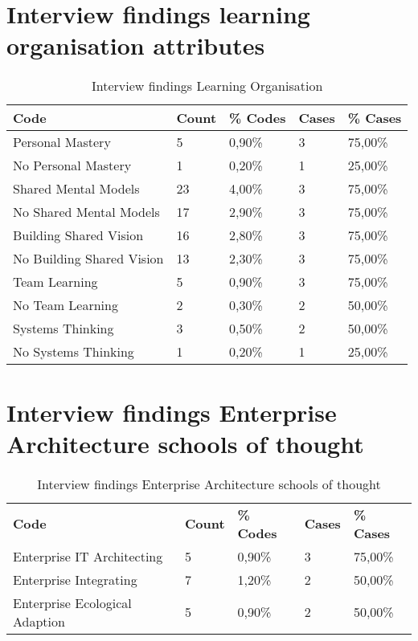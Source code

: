 \section{Interview findings learning organisation attributes}
\label{sec:interviewresultslearningorganisation}
\begin{table}[H]
	\centering
	\begin{tabular}{lllll}
		\toprule
		\textbf{Code} & \textbf{Count} & \textbf{\% Codes} & \textbf{Cases} & \textbf{\% Cases} \\
		\midrule
		Personal Mastery & 5     & 0,90\% & 3     & 75,00\% \\
		No Personal Mastery & 1     & 0,20\% & 1     & 25,00\% \\
		Shared Mental Models & 23    & 4,00\% & 3     & 75,00\% \\
		No Shared Mental Models & 17    & 2,90\% & 3     & 75,00\% \\
		Building Shared Vision & 16    & 2,80\% & 3     & 75,00\% \\
		No Building Shared Vision & 13    & 2,30\% & 3     & 75,00\% \\
		Team Learning & 5     & 0,90\% & 3     & 75,00\% \\
		No Team Learning & 2     & 0,30\% & 2     & 50,00\% \\
		Systems Thinking & 3     & 0,50\% & 2     & 50,00\% \\
		No Systems Thinking & 1     & 0,20\% & 1     & 25,00\% \\
		\bottomrule
	\end{tabular}%
	\caption{Interview findings Learning Organisation}%
	\label{tab:interviewresultslearningorganisation}%
\end{table}%

\section{Interview findings Enterprise Architecture schools of thought}
\label{sec:interviewresultseaschoolsofthought}
\begin{table}[H]
	\centering
	\begin{tabular}{lllll}
		\toprule
		\textbf{Code} & \textbf{Count} & \textbf{\% Codes} & \textbf{Cases} & \textbf{\% Cases} \\
		Enterprise IT Architecting & 5     & 0,90\% & 3     & 75,00\% \\
		Enterprise Integrating & 7     & 1,20\% & 2     & 50,00\% \\
		Enterprise Ecological Adaption & 5     & 0,90\% & 2     & 50,00\% \\
		\bottomrule
	\end{tabular}%
	\caption{Interview findings Enterprise Architecture schools of thought}%
	\label{tab:interviewresultseaschools}%
\end{table}%


